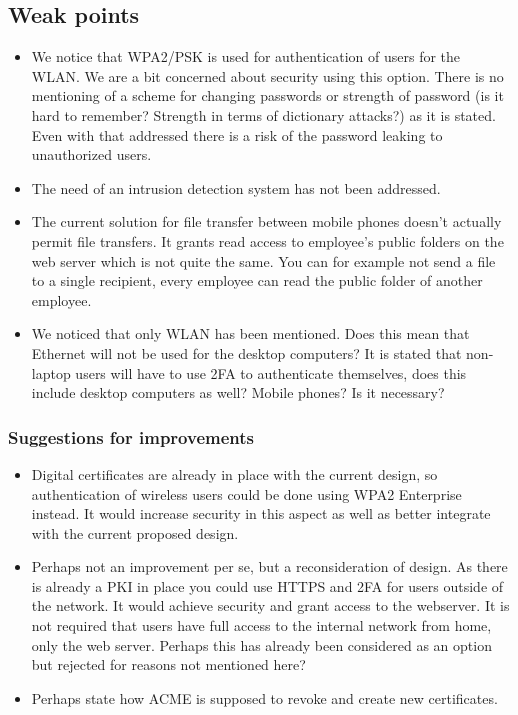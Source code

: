 \documentclass[a4paper,11pt,oneside]{article}
\begin{document}
\subsection*{Weak points}
\begin{itemize}
    \item We notice that WPA2/PSK is used for authentication of users for the WLAN. We are a bit concerned about security using this option. There is no mentioning of a scheme for changing passwords or strength of password (is it hard to remember? Strength in terms of dictionary attacks?) as it is stated. Even with that addressed there is a risk of the password leaking to unauthorized users.
    \item The need of an intrusion detection system has not been addressed.
    \item The current solution for file transfer between mobile phones doesn't actually permit file transfers. It grants read access to employee's public folders on the web server which is not quite the same. You can for example not send a file to a single recipient, every employee can read the public folder of another employee.
    \item We noticed that only WLAN has been mentioned. Does this mean that Ethernet will not be used for the desktop computers? It is stated that non-laptop users will have to use 2FA to authenticate themselves, does this include desktop computers as well? Mobile phones? Is it necessary?
\end{itemize}

\subsubsection*{Suggestions for improvements}

\begin{itemize}
    \item Digital certificates are already in place with the current design, so authentication of wireless users could be done using WPA2 Enterprise instead. It would increase security in this aspect as well as better integrate with the current proposed design.
    \item Perhaps not an improvement per se, but a reconsideration of design. As there is already a PKI in place you could use HTTPS and 2FA for users outside of the network. It would achieve security and grant access to the webserver. It is not required that users have full access to the internal network from home, only the web server. Perhaps this has already been considered as an option but rejected for reasons not mentioned here?
    \item Perhaps state how ACME is supposed to revoke and create new certificates.
\end{itemize}
\end{document}
